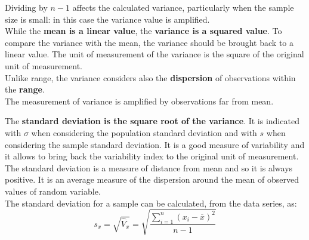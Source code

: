 \begin{frame}
  \vspace*{.4cm}
  Dividing by {\boldmath $ n-1 $} affects the calculated variance, particularly when the sample size is small: in this case the variance value is amplified.\\
  \vspace*{.4cm}
  While the \textbf{mean is a linear value}, the \textbf{variance is a squared value}. To compare the variance with the mean, the variance should be brought back to a linear value. The unit of measurement of the variance is the square of the original unit of measurement.\\
  \vspace*{.4cm}
  Unlike range, the variance considers also the \textbf{dispersion} of observations within the \textbf{range}.\\
  \vspace*{.4cm}
  The measurement of variance is amplified by observations far from mean.
\end{frame}


\begin{frame}
  \vspace*{.25cm}
  The \textbf{standard deviation is the square root of the variance}. It is indicated with {\boldmath$ \sigma $} when considering the population standard deviation and with {\boldmath$ s $} when considering the sample standard deviation. It is a good measure of variability and it allows to bring back the variability index to the original unit of measurement.\\
  \vspace*{.25cm}
  The standard deviation is a measure of distance from mean and so it is always positive. It is an average measure of the dispersion around the mean of observed values of random variable.\\
  \vspace*{.25cm}
  The standard deviation for a sample can be calculated, from the data series, as:\\
  \vspace*{.3cm}
  $$ s_x = \sqrt{\hat{V}_x} = \sqrt{\frac{\sum_{i=1}^n{\left(x_i-\overline{x}\right)^2}}{n-1}} $$
\end{frame}

